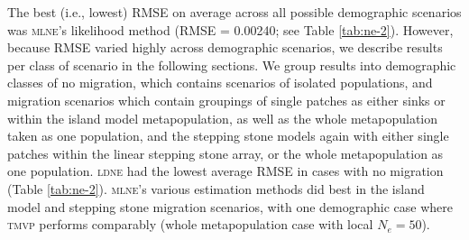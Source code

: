 The best (i.e., lowest) RMSE on average across all possible demographic scenarios was \textsc{mlne}'s 
likelihood method (RMSE = 0.00240; see Table \ref{tab:ne-2}). However, because RMSE varied highly across demographic 
scenarios, we describe results per class of scenario in the following sections. We group results 
into demographic classes of no migration, which contains scenarios of isolated populations, and 
migration scenarios which contain groupings of single patches as either sinks or within the island 
model metapopulation, as well as the whole metapopulation taken as one population, and the stepping 
stone models again with either single patches within the linear stepping stone array, or the whole 
metapopulation as one population. \textsc{ldne} had the lowest average RMSE in cases with no migration 
(Table \ref{tab:ne-2}). \textsc{mlne}'s various estimation methods did best in the island model and stepping stone 
migration scenarios, with one demographic case where \textsc{tmvp} performs comparably 
(whole metapopulation case with local $N_e = 50$).

